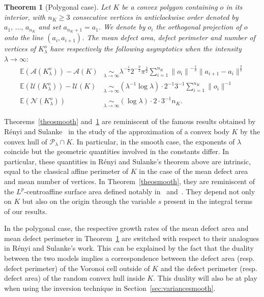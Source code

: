 \documentclass[10pt]{amsart}
\newtheorem{theo}{Theorem}[section]
\theoremstyle{definition}\newtheorem{defi}[theo]{Definition}\newtheorem{rema}[theo]{Remark}\newtheorem{exam}[theo]{Example}\newtheorem{exem}[theo]{Example}\newtheorem{nota}[theo]{Notation}
\newcommand{\cA}{\mathcal{A}}
\newcommand{\cN}{\mathcal{N}}
\newcommand{\cP}{\mathcal{P}}
\newcommand{\cU}{\mathcal{U}}
\newcommand{\E}{\mathbb{E}}
\newcommand{\pass}{\vspace{0.3cm}\noindent}
\begin{document}

\begin{theo}[Polygonal case]\label{theopolygon}
Let $K$ be a convex polygon containing $o$ in its interior, with $n_K\ge 3$ consecutive vertices in anticlockwise order denoted by $a_1,\,\ldots,\,a_{n_K}$ and set $a_{n_K+1}=a_1$. We denote by $o_i$ the orthogonal projection of $o$ onto the line $(a_i,a_{i+1})$. The mean defect area, defect perimeter and number of vertices of $K_{\lambda}^o$ have respectively the following asymptotics when the intensity $\lambda\to\infty:$
\begin{align}
\tag{$\rm i$}\label{theo1.2.i} \E(\cA(K_{\lambda}^o))-\cA(K) &\underset{\lambda\to\infty}{\sim}
 \lambda^{-\frac1{2}}2^{-\frac{9}{2}}\pi^{\frac{3}{2}} \sum_{i=1}^{n_K} {\|o_i\|}^{-\frac1{2}}\|a_{i+1}-a_i\|^{\frac{3}{2}}\\
\tag{$\rm ii$}\label{theo1.2.ii} \E(\cU(K_{\lambda}^o))-\cU(K) &\underset{\lambda\to\infty}{\sim} \left(\lambda^{-1}\log \lambda\right)\cdot 2^{-1} 3^{-1}\sum_{i=1}^{n_K} \|o_i\|^{-1}\\
\tag{$\rm iii$}\label{theo1.2.iii} \E(\cN(K_{\lambda}^o)) &\underset{\lambda\to\infty}{\sim}(\log\lambda)\cdot 2\cdot 3^{-1}n_K.
\end{align}
\end{theo}

Theorems~\ref{theosmooth} and~\ref{theopolygon} are reminiscent of the famous results obtained by R\'enyi and Sulanke~\cite{resu63,resu64} in the study of the approximation of a convex body $K$ by the convex hull of $\cP_\lambda\cap K$. In particular, in the smooth case, the exponents of $\lambda$ coincide but the geometric quantities involved in the constants differ. In particular, these quantities in R\'enyi and Sulanke's theorem above are intrinsic, equal to the classical affine perimeter of $K$ in the case of the mean defect area and mean number of vertices. In Theorem~\ref{theosmooth}, they are reminiscent of the $L^p$-centroaffine surface area defined notably in~\cite{Hug96} and~\cite{Lut96}. They depend not only on $K$ but also on the origin through the variable $s$ present in the integral terms of our results.

In the polygonal case, the respective growth rates of the mean defect area and mean defect perimeter in Theorem~\ref{theopolygon} are switched with respect to their analogues in R\'enyi and Sulanke's work. This can be explained by the fact that the duality between the two models implies a correspondence between the defect area (resp. defect perimeter) of the Voronoi cell outside of $K$ and the defect perimeter (resp. defect area) of the random convex hull inside $K$. This duality will also be at play when using the inversion technique in Section~\ref{sec:variancesmooth}.
\end{document}
